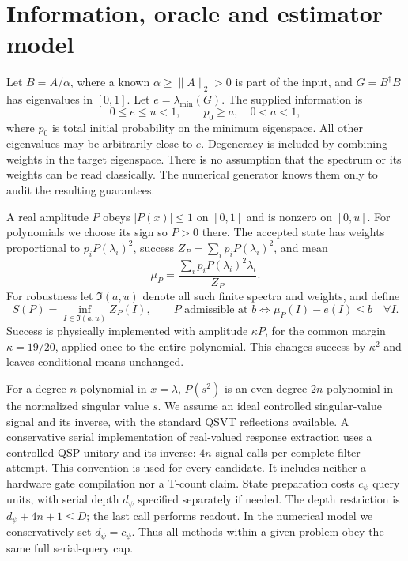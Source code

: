 \documentclass[11pt]{article}
\begin{document}
\section{Information, oracle and estimator model}\label{sec:model}
Let $B=A/\alpha$, where a known $\alpha\geq\|A\|_2>0$ is part of the input,
and $G=B^\dagger B$ has eigenvalues in $[0,1]$. Let $e=\lambda_{\min}(G)$.
The supplied information is
\begin{equation}\label{eq:prior}
 0\leq e\leq u<1,\qquad p_0\geq a,\quad 0<a<1,
\end{equation}
where $p_0$ is total initial probability on the minimum eigenspace.
All other eigenvalues may be arbitrarily close to $e$. Degeneracy is
included by combining weights in the target eigenspace. There is no
assumption that the spectrum or its weights can be read classically.
The numerical generator knows them only to audit the resulting guarantees.

A real amplitude $P$ obeys $|P(x)|\leq1$ on $[0,1]$ and is nonzero on
$[0,u]$. For polynomials we choose its sign so $P>0$ there. The accepted
state has weights proportional to $p_iP(\lambda_i)^2$, success
$Z_P=\sum_i p_iP(\lambda_i)^2$, and mean
\[
 \mu_P=\frac{\sum_i p_iP(\lambda_i)^2\lambda_i}{Z_P}.
\]
For robustness let $\mathfrak I(a,u)$ denote all such finite spectra and
weights, and define
\[
 S(P)=\inf_{I\in\mathfrak I(a,u)}Z_P(I),\qquad
 P\text{ admissible at }b\iff \mu_P(I)-e(I)\leq b\quad\forall I.
\]
Success is physically implemented with amplitude $\kappa P$, for the common
margin $\kappa=19/20$, applied once to the entire polynomial. This changes
success by $\kappa^2$ and leaves conditional means unchanged.

For a degree-$n$ polynomial in $x=\lambda$, $P(s^2)$ is an even degree-$2n$
polynomial in the normalized singular value $s$. We assume an ideal
controlled singular-value signal and its inverse, with the standard QSVT
reflections available. A conservative serial implementation of real-valued
response extraction uses a controlled QSP unitary and its inverse: $4n$ signal calls
per complete filter attempt. This convention is used for every candidate.
It includes neither a hardware gate compilation nor a T-count claim.
State preparation costs $c_\psi$ query units, with serial depth $d_\psi$
specified separately if needed. The depth restriction is
$d_\psi+4n+1\leq D$; the last call performs readout. In the numerical model
we conservatively set $d_\psi=c_\psi$. Thus all methods within a given
problem obey the same full serial-query cap.
\end{document}
